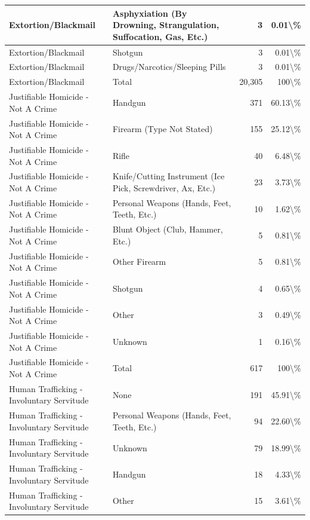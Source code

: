 \documentclass[
]{krantz}
\begin{document}
\begin{longtable}[t]{l|l|r|r}
\hline
Extortion/Blackmail & Asphyxiation (By Drowning, Strangulation, Suffocation, Gas, Etc.) & 3 & 0.01\textbackslash{}\%\\
\hline
Extortion/Blackmail & Shotgun & 3 & 0.01\textbackslash{}\%\\
\hline
Extortion/Blackmail & Drugs/Narcotics/Sleeping Pills & 3 & 0.01\textbackslash{}\%\\
\hline
Extortion/Blackmail & Total & 20,305 & 100\textbackslash{}\%\\
\hline
Justifiable Homicide - Not A Crime & Handgun & 371 & 60.13\textbackslash{}\%\\
\hline
Justifiable Homicide - Not A Crime & Firearm (Type Not Stated) & 155 & 25.12\textbackslash{}\%\\
\hline
Justifiable Homicide - Not A Crime & Rifle & 40 & 6.48\textbackslash{}\%\\
\hline
Justifiable Homicide - Not A Crime & Knife/Cutting Instrument (Ice Pick, Screwdriver, Ax, Etc.) & 23 & 3.73\textbackslash{}\%\\
\hline
Justifiable Homicide - Not A Crime & Personal Weapons (Hands, Feet, Teeth, Etc.) & 10 & 1.62\textbackslash{}\%\\
\hline
Justifiable Homicide - Not A Crime & Blunt Object (Club, Hammer, Etc.) & 5 & 0.81\textbackslash{}\%\\
\hline
Justifiable Homicide - Not A Crime & Other Firearm & 5 & 0.81\textbackslash{}\%\\
\hline
Justifiable Homicide - Not A Crime & Shotgun & 4 & 0.65\textbackslash{}\%\\
\hline
Justifiable Homicide - Not A Crime & Other & 3 & 0.49\textbackslash{}\%\\
\hline
Justifiable Homicide - Not A Crime & Unknown & 1 & 0.16\textbackslash{}\%\\
\hline
Justifiable Homicide - Not A Crime & Total & 617 & 100\textbackslash{}\%\\
\hline
Human Trafficking - Involuntary Servitude & None & 191 & 45.91\textbackslash{}\%\\
\hline
Human Trafficking - Involuntary Servitude & Personal Weapons (Hands, Feet, Teeth, Etc.) & 94 & 22.60\textbackslash{}\%\\
\hline
Human Trafficking - Involuntary Servitude & Unknown & 79 & 18.99\textbackslash{}\%\\
\hline
Human Trafficking - Involuntary Servitude & Handgun & 18 & 4.33\textbackslash{}\%\\
\hline
Human Trafficking - Involuntary Servitude & Other & 15 & 3.61\textbackslash{}\%\\

\end{longtable}
\end{document}
